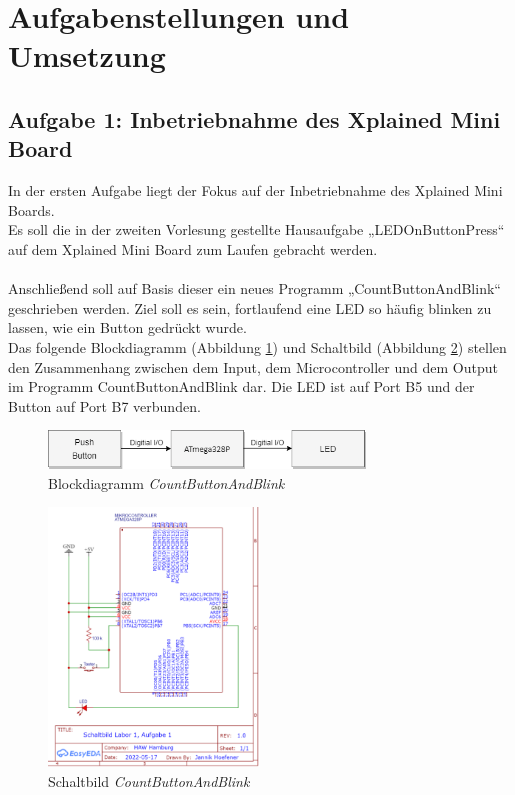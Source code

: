 \documentclass{article}
\begin{document}
\section{Aufgabenstellungen und Umsetzung}

\subsection{Aufgabe 1: Inbetriebnahme des Xplained Mini Board}

In der ersten Aufgabe liegt der Fokus auf der Inbetriebnahme des Xplained Mini Boards.
\\
Es soll die in der zweiten Vorlesung gestellte Hausaufgabe „LEDOnButtonPress“ auf dem Xplained Mini Board zum Laufen gebracht werden. \\  
\\
Anschließend soll auf Basis dieser ein neues Programm „CountButtonAndBlink“ geschrieben werden. Ziel soll es sein, fortlaufend eine LED so häufig blinken zu lassen, wie ein Button gedrückt wurde.
\\
Das folgende Blockdiagramm (Abbildung \ref{fig:bd-a1}) und Schaltbild (Abbildung \ref{fig:sb-a1}) stellen den Zusammenhang zwischen dem Input, dem Microcontroller und dem Output im Programm CountButtonAndBlink dar. Die LED ist auf Port B5 und der Button auf Port B7 verbunden.\\

\begin{figure}[htb]
    \centering
    \includegraphics[width=0.75\textwidth]{images/A1-BD-CountButtonAndBlink.d.png}
    \caption{Blockdiagramm \textit{CountButtonAndBlink}}
    \label{fig:bd-a1}
\end{figure}

\begin{figure}[htb]
    \centering
    \includegraphics[width=0.5\textwidth]{images/A1-Schaltbild.png}
    \caption{Schaltbild \textit{CountButtonAndBlink}}
    \label{fig:sb-a1}
\end{figure}
\end{document}
